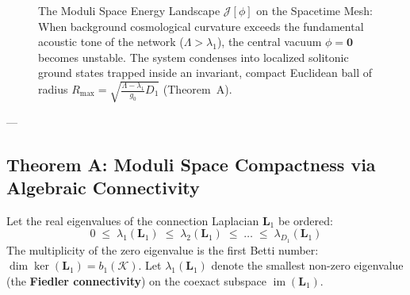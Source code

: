 \documentclass[
    12pt,
    a4paper,
    headings=normal,
    twoside=false,
    open=any,
    parskip=half
]{scrbook}
\newcommand{\moduliS}{\mathscr{S}_{\text{EMG}}}
\begin{document}
\begin{figure}[htbp]
\caption{The Moduli Space Energy Landscape $\mathcal{J}[\phi]$ on the Spacetime Mesh: When background cosmological curvature exceeds the fundamental acoustic tone of the network ($\Lambda > \lambda_1$), the central vacuum $\phi = \mathbf{0}$ becomes unstable. The system condenses into localized solitonic ground states trapped inside an invariant, compact Euclidean ball of radius $R_{\max} = \sqrt{\frac{\Lambda - \lambda_1}{g_0} D_1}$ (Theorem~A).}
\label{fig:ch1_moduli_compactness_surface}
\end{figure}

---

\subsection{Theorem A: Moduli Space Compactness via Algebraic Connectivity}

Let the real eigenvalues of the connection Laplacian $\mathbf{L}_1$ be ordered:
\begin{equation}
0 \;\le\; \lambda_1(\mathbf{L}_1) \;\le\; \lambda_2(\mathbf{L}_1) \;\le\; \dots \;\le\; \lambda_{D_1}(\mathbf{L}_1)
\end{equation}
The multiplicity of the zero eigenvalue is the first Betti number: $\dim\ker(\mathbf{L}_1) = b_1(\mathcal{K})$. Let $\lambda_1(\mathbf{L}_1)$ denote the smallest non-zero eigenvalue (the \textbf{Fiedler connectivity}) on the coexact subspace $\operatorname{im}(\mathbf{L}_1)$.
\end{document}
